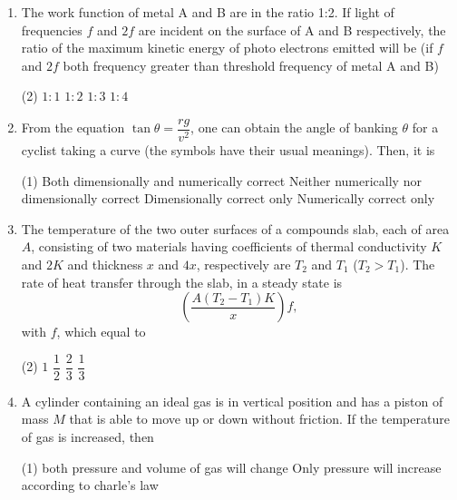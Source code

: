 \documentclass[twocolumn]{article}
\renewcommand{\frac}[2]{\dfrac{#1}{#2}}
\begin{document}
\begin{enumerate}
    \item The work function of metal A and B are in the ratio 1:2. If light of frequencies \( f \) and \( 2f \) are incident on the surface of A and B respectively, the ratio of the maximum kinetic energy of photo electrons emitted will be (if \( f \) and \( 2f \) both frequency greater than threshold frequency of metal A and B)
    \begin{tasks}(2)
        \task \( 1 : 1 \)
        \task \( 1 : 2 \)
        \task \( 1 : 3 \)
        \task \( 1 : 4 \)
    \end{tasks}
    \item From the equation \( \tan\theta = \frac{rg}{v^2} \), one can obtain the angle of banking \( \theta \) for a cyclist taking a curve (the symbols have their usual meanings). Then, it is
    \begin{tasks}(1)
        \task Both dimensionally and numerically correct
        \task Neither numerically nor dimensionally correct
        \task Dimensionally correct only
        \task Numerically correct only
    \end{tasks}
    \item The temperature of the two outer surfaces of a compounds slab, each of area \( A \), consisting of two materials having coefficients of thermal conductivity \( K \) and \( 2K \) and thickness \( x \) and \( 4x \), respectively are \( T_2 \) and \( T_1 \) (\( T_2 > T_1 \)). The rate of heat transfer through the slab, in a steady state is \[ \left( \frac{A(T_2 - T_1)K}{x} \right) f, \] with \( f \), which equal to
    \begin{tasks}(2)
        \task \( 1 \)
        \task \( \frac{1}{2} \)
        \task \( \frac{2}{3} \)
        \task \( \frac{1}{3} \)
    \end{tasks}
    \begin{center}
    \end{center}
    \item A cylinder containing an ideal gas is in vertical position and has a piston of mass \( M \) that is able to move up or down without friction. If the temperature of gas is increased, then
    \begin{tasks}(1)
        \task both pressure and volume of gas will change
        \task Only pressure will increase according to charle's law

\end{tasks}
\end{enumerate}
\end{document}
